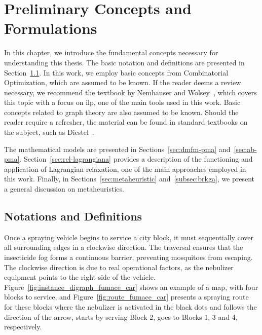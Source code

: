 \chapter{Preliminary Concepts and Formulations}\label{chp:preliminary-concepts}

In this chapter, we introduce the fundamental concepts necessary for
understanding this thesis. The basic notation and definitions are presented in
Section~\ref{sec:not-e-def}. In this work, we employ basic concepts from
Combinatorial Optimization, which are assumed to be known. If the reader deems a
review necessary, we recommend the textbook by Nemhauser and
Wolsey~\cite{Nemhauser}, which covers this topic with a focus on \gls{ilp}, one
of the main tools used in this work. Basic concepts related to graph theory are
also assumed to be known. Should the
reader require a refresher, the material can be found in standard textbooks on
the subject, such as Diestel~\cite{diestel:2005}. 

The mathematical models are presented in Sections~\ref{sec:dmfm-pma}
and~\ref{sec:ab-pma}. Section~\ref{sec:rel-lagrangiana} provides a description
of the functioning and application of Lagrangian relaxation, one of the main
approaches employed in this work. Finally, in Sections~\ref{sec:metaheuristic}
and~\ref{subsec:brkga}, we present a general discussion on metaheuristics.


\section{Notations and Definitions} \label{sec:not-e-def}

Once a spraying vehicle begins to service a city block, it must sequentially
cover all surrounding edges in a clockwise direction. The
traversal ensures that the insecticide fog forms a continuous barrier,
preventing mosquitoes from escaping. 
The clockwise direction is due to real operational factors, 
as the nebulizer equipment points to the right side of the
vehicle. 
Figure~\ref{fig:instance_digraph_fumace_car} shows an example of a map,
with four blocks to service, and Figure~\ref{fig:route_fumace_car} presents a
spraying route for these blocks where the nebulizer is activated in the black
dots and follows the direction of the arrow, starts by serving Block 2, goes to
Blocks 1, 3 and 4, respectively.

